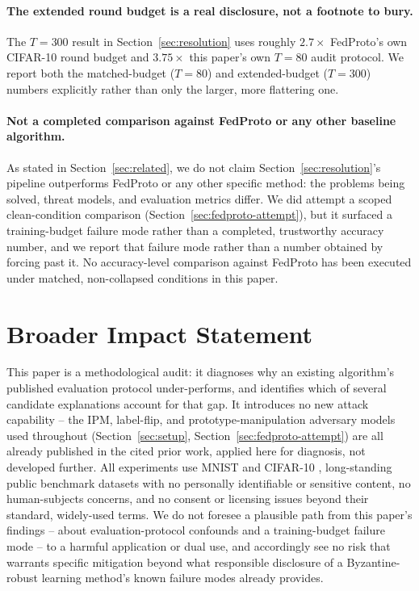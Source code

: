 \documentclass{article}
\begin{document}
\paragraph{The extended round budget is a real disclosure, not a footnote to
bury.} The $T{=}300$ result in Section~\ref{sec:resolution} uses roughly
$2.7\times$ FedProto's own CIFAR-10 round budget and $3.75\times$ this paper's
own $T{=}80$ audit protocol. We report both the matched-budget ($T{=}80$) and
extended-budget ($T{=}300$) numbers explicitly rather than only the larger,
more flattering one.

\paragraph{Not a completed comparison against FedProto or any other baseline
algorithm.} As stated in Section~\ref{sec:related}, we do not claim
Section~\ref{sec:resolution}'s pipeline outperforms FedProto or any other
specific method: the problems being solved, threat models, and evaluation
metrics differ. We did attempt a scoped clean-condition comparison
(Section~\ref{sec:fedproto-attempt}), but it surfaced a training-budget failure
mode rather than a completed, trustworthy accuracy number, and we report that
failure mode rather than a number obtained by forcing past it. No accuracy-level
comparison against FedProto has been executed under matched, non-collapsed
conditions in this paper.

\section{Broader Impact Statement}
\label{sec:broader-impact}

This paper is a methodological audit: it diagnoses why an existing algorithm's
published evaluation protocol under-performs, and identifies which of several
candidate explanations account for that gap. It introduces no new attack
capability -- the IPM, label-flip, and prototype-manipulation adversary models
used throughout (Section~\ref{sec:setup}, Section~\ref{sec:fedproto-attempt})
are all already published in the cited prior work, applied here for diagnosis,
not developed further. All experiments use MNIST \citep{lecun2010mnist} and
CIFAR-10 \citep{krizhevsky2009cifar}, long-standing public benchmark datasets
with no personally identifiable or sensitive content, no human-subjects
concerns, and no consent or licensing issues beyond their standard, widely-used
terms. We do not foresee a plausible path from this paper's findings -- about
evaluation-protocol confounds and a training-budget failure mode -- to a
harmful application or dual use, and accordingly see no risk that warrants
specific mitigation beyond what responsible disclosure of a Byzantine-robust
learning method's known failure modes already provides.
\end{document}
